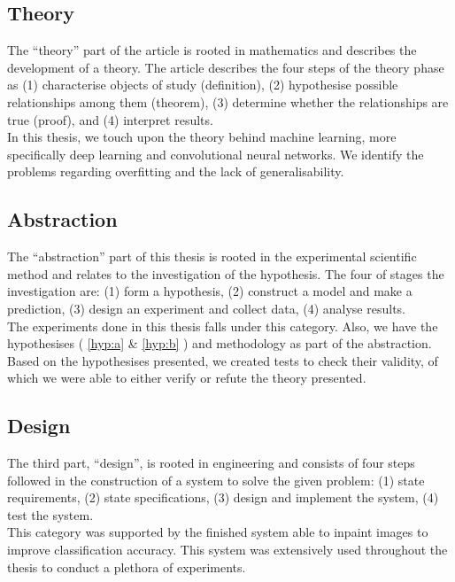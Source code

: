 \subsection{Theory}
The ``theory'' part of the article is rooted in mathematics and describes the development of a theory. The article describes the four steps of the theory phase as (1) characterise objects of study (definition), (2) hypothesise
possible relationships among them (theorem), (3) determine whether the
relationships are true (proof), and (4) interpret results.\\

In this thesis, we touch upon the theory behind machine learning, more specifically deep learning and convolutional neural networks. We identify the problems regarding overfitting and the lack of generalisability.



\subsection{Abstraction}
The ``abstraction'' part of this thesis is rooted in the experimental scientific method and relates to the investigation of the hypothesis. The four of stages the investigation are: (1) form a hypothesis, (2) construct a model and make a prediction, (3) design an experiment and collect data, (4) analyse results. \\

The experiments done in this thesis falls under this category. Also, we have the hypothesises ( \ref{hyp:a} \& \ref{hyp:b} ) and methodology as part of the abstraction. Based on the hypothesises presented, we created tests to check their validity, of which we were able to either verify or refute the theory presented.



\subsection{Design}
The third part, ``design'', is rooted in engineering
and consists of four steps followed in the construction
of a system to solve the given problem: (1) state requirements, (2) state specifications, (3) design and implement the system, (4) test the system. \\

This category was supported by the finished system able to inpaint images to improve classification accuracy. This system was extensively used throughout the thesis to conduct a plethora of experiments.



